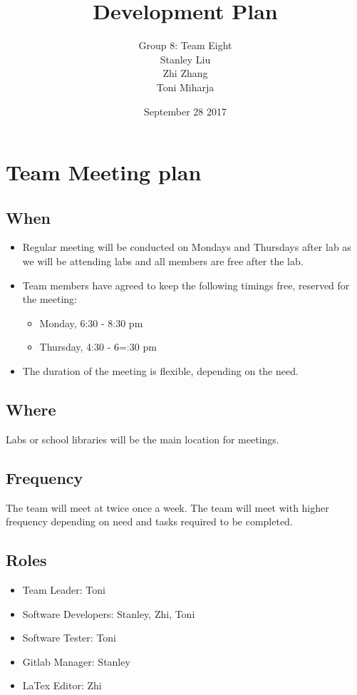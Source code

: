 \documentclass{article}
\title{\textbf{Development Plan}}
\author{Group 8: Team Eight\\
        Stanley Liu\\
        Zhi Zhang\\
        Toni Miharja\\}
\date{September 28 2017}
\begin{document}
\maketitle

\section{Team Meeting plan}
\subsection{When}
\begin{itemize}
    \item Regular meeting will be conducted on Mondays and Thursdays after lab as we will be attending labs and all members are free after the lab.
    \item Team members have agreed to keep the following timings free, reserved for the meeting:
    \begin{itemize}
        \item Monday, 6:30 - 8\textcolor{red}{:}30 pm
        \item Thursday, 4\textcolor{red}{:}30 - 6=\textcolor{red}{:}30 pm
    \end{itemize}
    \item The duration of the meeting is flexible, depending on the need.
\end{itemize}

\subsection{Where}
Labs or school libraries will be the main location for meetings.

\subsection{Frequency}
The team will meet at twice once a week. The team will meet with higher frequency depending on need and tasks required to be completed.
\subsection{Roles}
\begin{itemize}
    \item Team Leader: Toni
    \item Software Developers: Stanley, Zhi, Toni
    \item Software Tester: Toni
    \item Gitlab Manager: Stanley
    \item LaTex Editor: Zhi
\end{itemize}
\end{document}
